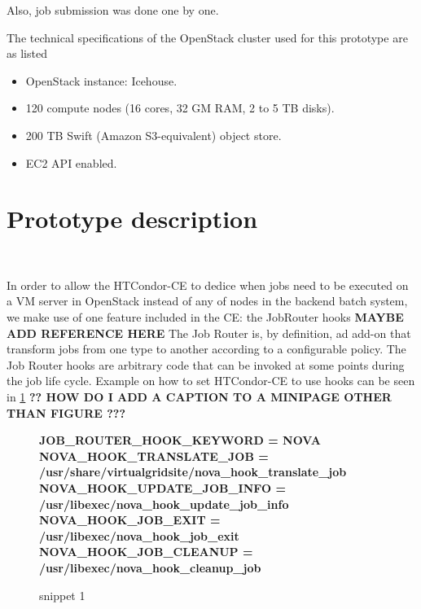 \documentclass[a4paper]{jpconf}
\begin{document}
Also, job submission was done one by one.

The technical specifications of the OpenStack cluster used for this prototype are as listed 

\begin{itemize}
\item OpenStack instance: Icehouse.
\item 120 compute nodes (16 cores, 32 GM RAM, 2 to 5 TB disks).
\item 200 TB Swift (Amazon S3-equivalent) object store.
\item EC2 API enabled.
\end{itemize}


\section{Prototype description}

~

In order to allow the HTCondor-CE to dedice when jobs need to be executed on a VM server in OpenStack 
instead of any of nodes in the backend batch system,
we make use of one feature included in the CE: the JobRouter hooks \textbf{MAYBE ADD REFERENCE HERE} \newline
The Job Router is, by definition, ad add-on that transform jobs from one type to another according to a configurable policy. 
The Job Router hooks are arbitrary code that can be invoked at some points during the job life cycle.
Example on how to set HTCondor-CE to use hooks can be seen in \ref{snippet1} 
\newline \textbf{?? HOW DO I ADD A CAPTION TO A MINIPAGE OTHER THAN FIGURE ???}

\begin{figure}[h!]
    \colorbox{htcondorbox}{
        \begin{minipage}{\textwidth}
        \small
            \bf{JOB\_ROUTER\_HOOK\_KEYWORD = NOVA \newline \newline
                NOVA\_HOOK\_TRANSLATE\_JOB = /usr/share/virtualgridsite/nova\_hook\_translate\_job \newline
                NOVA\_HOOK\_UPDATE\_JOB\_INFO = /usr/libexec/nova\_hook\_update\_job\_info \newline
                NOVA\_HOOK\_JOB\_EXIT = /usr/libexec/nova\_hook\_job\_exit \newline
                NOVA\_HOOK\_JOB\_CLEANUP = /usr/libexec/nova\_hook\_cleanup\_job
            }
        \end{minipage}
    }
\caption{snippet 1}
\label{snippet1}
\end{figure}
\end{document}
